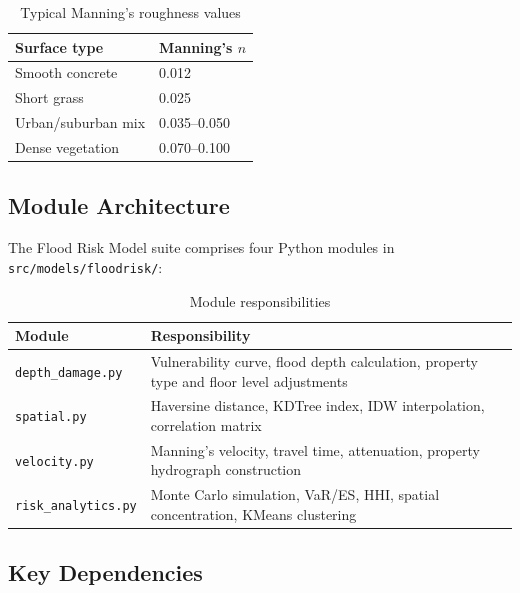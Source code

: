 \documentclass[11pt,a4paper]{article}
\begin{document}
\begin{table}[H]
\centering
\begin{tabular}{ll}
    \toprule
    \textbf{Surface type} & \textbf{Manning's $n$} \\
    \midrule
    Smooth concrete        & 0.012 \\
    Short grass            & 0.025 \\
    Urban/suburban mix     & 0.035--0.050 \\
    Dense vegetation       & 0.070--0.100 \\
    \bottomrule
\end{tabular}
\caption{Typical Manning's roughness values}
\label{tab:manning_n}
\end{table}

\mkmimplementation

\subsection{Module Architecture}

The Flood Risk Model suite comprises four Python modules in \texttt{src/models/floodrisk/}:

\begin{table}[H]
\centering
\begin{tabular}{lp{9cm}}
    \toprule
    \textbf{Module} & \textbf{Responsibility} \\
    \midrule
    \texttt{depth\_damage.py} & Vulnerability curve, flood depth calculation,
        property type and floor level adjustments \\
    \texttt{spatial.py} & Haversine distance, KDTree index, IDW interpolation,
        correlation matrix \\
    \texttt{velocity.py} & Manning's velocity, travel time, attenuation,
        property hydrograph construction \\
    \texttt{risk\_analytics.py} & Monte Carlo simulation, VaR/ES, HHI, spatial
        concentration, KMeans clustering \\
    \bottomrule
\end{tabular}
\caption{Module responsibilities}
\label{tab:modules}
\end{table}

\subsection{Key Dependencies}
\end{document}
